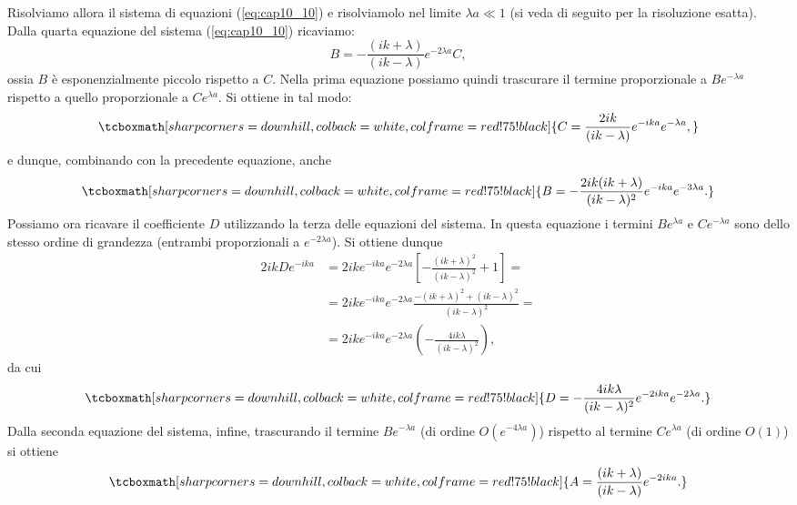 \documentclass[a4paper,12pt,oneside]{book}
\begin{document}
Risolviamo allora il sistema di equazioni (\ref{eq:cap10_10}) e risolviamolo nel limite ${\lambda a \ll 1}$ (si veda di seguito per la risoluzione esatta). Dalla quarta equazione del sistema (\ref{eq:cap10_10}) ricaviamo:
	\begin{equation}
		B=-\frac{(ik+\lambda)}{(ik-\lambda)}e^{-2 \lambda a } C,
	\end{equation}
ossia $B$ è esponenzialmente piccolo rispetto a $C$.  Nella prima equazione possiamo quindi trascurare il termine proporzionale a $Be^{-\lambda a}$ rispetto a quello proporzionale a $Ce^{\lambda a }$. Si ottiene in tal modo:
	\begin{equation}
		\tcboxmath[sharp corners=downhill, colback=white, colframe=red!75!black]{
			C= \frac{2ik}{(ik-\lambda)}e^{-ika}e^{-\lambda a},
			}
	\end{equation}
e dunque, combinando con la precedente equazione, anche
	\begin{equation}
		\tcboxmath[sharp corners=downhill, colback=white, colframe=red!75!black]{
			B=-\frac{2ik(ik+\lambda)}{(ik-\lambda)^2}e^{-ik a }e^{-3 \lambda a }.
			}
	\end{equation}
Possiamo ora ricavare il coefficiente $D$ utilizzando la terza delle equazioni del sistema. In questa equazione i termini $Be^{\lambda a }$ e $Ce^{-\lambda a }$ sono dello stesso ordine di grandezza (entrambi proporzionali a $e^{-2\lambda a}$). Si ottiene dunque
	\begin{align}
		2ikDe^{-ika}&= 2ike^{-ika}e^{-2\lambda a} \left[-\frac{(ik+\lambda)^2}{(ik-\lambda)^2}+1\right]= \nonumber \\
		&= 2ike^{-ika}e^{-2\lambda a}\frac{-(ik+\lambda)^2+(ik-\lambda)^2}{(ik-\lambda)^2}= \nonumber \\
		&= 2ike^{-ika}e^{-2\lambda a}\left( -\frac{4ik\lambda}{(ik-\lambda)^2}\right),
	\end{align}
da cui
	\begin{equation}
		\tcboxmath[sharp corners=downhill, colback=white, colframe=red!75!black]{
			D= -\frac{4ik\lambda}{(ik-\lambda)^2}e^{-2ika}e^{-2\lambda a}.
			}
	\end{equation}
Dalla seconda equazione del sistema, infine, trascurando il termine $Be^{-\lambda a}$ (di ordine $O(e^{-4\lambda a })$) rispetto al termine $Ce^{\lambda a}$ (di ordine $O(1)$) si ottiene
	\begin{equation}
		\tcboxmath[sharp corners=downhill, colback=white, colframe=red!75!black]{
			A=\frac{(ik+\lambda)}{(ik-\lambda)}e^{-2ika}.
			}
	\end{equation}\\
	
\end{document}
